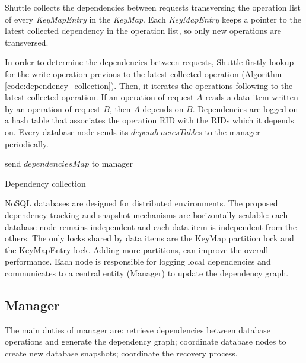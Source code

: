 Shuttle collects the dependencies between requests transversing the operation list of every \emph{KeyMapEntry} in the \emph{KeyMap}. Each \emph{KeyMapEntry} keeps a pointer to the latest collected dependency in the operation list, so only new operations are transversed.

In order to determine the dependencies between requests, Shuttle firstly lookup for the write operation previous to the latest collected operation (Algorithm \ref{code:dependency_collection}). Then, it iterates the operations following to the latest collected operation. If an operation of request $A$ reads a data item written by an operation of request $B$, then $A$ depends on $B$. Dependencies are logged on a hash table that associates the operation \ac{RID} with the \ac{RID}s which it depends on. Every database node sends its $dependenciesTable$s to the manager periodically. 

 
\begin{algorithm}[H]
\DontPrintSemicolon{}
	\;
	\BlankLine
	\BlankLine
	send $dependenciesMap$ to manager\;

 \caption{Dependency collection}
\label{code:dependency_collection}
\end{algorithm}


\acs{NoSQL} databases are designed for distributed environments. The proposed dependency tracking and snapshot mechanisms are horizontally scalable: each database node remains independent and each data item is independent from the others. The only locks shared by data items are the KeyMap partition lock and the KeyMapEntry lock. Adding more partitions, can improve the overall performance. Each node is responsible for logging local dependencies and communicates to a central entity (Manager) to update the  dependency graph. 


\subsection{Manager}\label{sec:impl:normal:manager}
The main duties of manager are: retrieve dependencies between database operations and generate the dependency graph; coordinate database nodes to create new database snapshots; coordinate the recovery process. 

